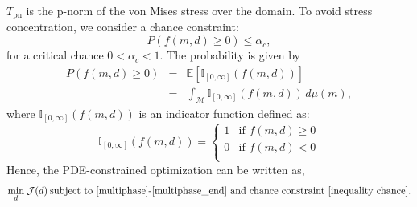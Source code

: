 \documentclass[pdf-a,balance,colorlinks,upint,subscriptcorrection,varvw,mathalfa=cal=boondoxo, spanish,french,vietnamese,russian,greek]{asmeconf}
\begin{document}
$T_{\text{pn}}$ is the p-norm of the von Mises stress over the domain.
To avoid stress concentration, we consider a chance constraint:
%
    \begin{equation} \label{inequality chance}
        P(f(m,d) \geq 0) \leq \alpha_{c},
    \end{equation}
%
    for a critical chance $0 < \alpha_{c} <1$.
    The probability is given by 
    \begin{eqnarray}
        P(f(m,d) \geq 0) & = & \mathbb{E}[\mathbb{I}_{[0,\infty]} (f(m,d))] \nonumber\\
        & = & \int_{\mathcal{M}} \mathbb{I}_{[0,\infty]} (f(m,d)) \, d \mu(m),
    \end{eqnarray}
    where $\mathbb{I}_{[0,\infty]} (f(m,d))$ is an indicator function defined as:
    \[
 \mathbb{I}_{[0,\infty]} (f(m,d)) =
\begin{cases}
  1 & \text{if } f(m,d) \geq 0 \\
  0 & \text{if } f(m,d) < 0 \\
\end{cases}
\]
Hence, the PDE-constrained optimization can be written as,
 \begin{equation}
     \underset{d}{\text{min}} \: \mathcal{J}(d) \: \text{subject to \eqref{multiphase}-\eqref{multiphase_end} and chance constraint \eqref{inequality chance}}.
 \end{equation}
 
\end{document}
